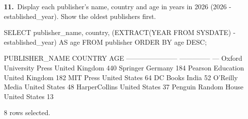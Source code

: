 \noindent\begin{minipage}{\linewidth}
\begingroup{}
{\fontsize{14}{17}\selectfont\textbf{11.}}\ Display each publisher's name, country and age in years in 2026 (2026 - established\_year). Show the oldest publishers first.\par
\endgroup\vspace{12pt}


\begin{sqlcode}
SELECT publisher_name, country,
       (EXTRACT(YEAR FROM SYSDATE) - established_year) AS age
FROM publisher
ORDER BY age DESC;
\end{sqlcode}

\vspace{18pt}


\begin{sqlout}[fontsize=\small]
PUBLISHER_NAME           COUNTRY         AGE
-----------------------  --------------  ---
Oxford University Press  United Kingdom  440
Springer                 Germany         184
Pearson Education        United Kingdom  182
MIT Press                United States    64
DC Books                 India            52
O'Reilly Media           United States    48
HarperCollins            United States    37
Penguin Random House     United States    13

8 rows selected.
\end{sqlout}
\end{minipage}\par\vspace{24pt}

